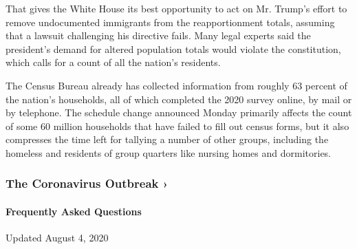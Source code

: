 That gives the White House its best opportunity to act on Mr. Trump's
effort to remove undocumented immigrants from the reapportionment
totals, assuming that a lawsuit challenging his directive fails. Many
legal experts said the president's demand for altered population totals
would violate the constitution, which calls for a count of all the
nation's residents.

The Census Bureau already has collected information from roughly 63
percent of the nation's households, all of which completed the 2020
survey online, by mail or by telephone. The schedule change announced
Monday primarily affects the count of some 60 million households that
have failed to fill out census forms, but it also compresses the time
left for tallying a number of other groups, including the homeless and
residents of group quarters like nursing homes and dormitories.

\href{https://www.nytimes.com/news-event/coronavirus?action=click\&pgtype=Article\&state=default\&region=MAIN_CONTENT_3\&context=storylines_faq}{}

\hypertarget{the-coronavirus-outbreak-}{%
\subsubsection{The Coronavirus Outbreak
›}\label{the-coronavirus-outbreak-}}

\hypertarget{frequently-asked-questions}{%
\paragraph{Frequently Asked
Questions}\label{frequently-asked-questions}}

Updated August 4, 2020

